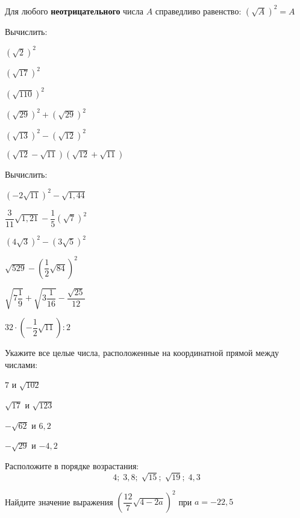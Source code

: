 \begin{class}[number=2]
\begin{definit}
		Для любого \textbf{неотрицательного} числа \( A \) справедливо равенство: \( \left( \sqrt{A} \right)^2=A \)
	\end{definit}
	\begin{listofex}[resume]
		\item Вычислить:
		\begin{enumcols}[itemcolumns=3]
			\item \( (\sqrt{2})^2 \)
			\item \( (\sqrt{17})^2 \)
			\item \( (\sqrt{110})^2 \)
			\item \( (\sqrt{29})^2+(\sqrt{29})^2 \)
			\item \( (\sqrt{13})^2-(\sqrt{12})^2 \)
			\item \( (\sqrt{12}-\sqrt{11})(\sqrt{12}+\sqrt{11}) \)

		\end{enumcols}
		\item Вычислить:
		\begin{enumcols}[itemcolumns=3]
			\item \( (-2\sqrt{11})^2-\sqrt{1,44} \)
			\item \( \dfrac{3}{11}\sqrt{1,21}-\dfrac{1}{5}(\sqrt{7})^2 \)
			\item \( (4\sqrt{3})^2-(3\sqrt{5})^2 \)
			\item \( \sqrt{529}-\left( \dfrac{1}{2}\sqrt{84} \right)^2 \)
			\item \( \sqrt{7\dfrac{1}{9}}+\sqrt{3\dfrac{1}{16}}-\dfrac{\sqrt{25}}{12} \)
			\item \( 32\cdot\left( -\dfrac{1}{2}\sqrt{11} \right):2 \)
		\end{enumcols}
		\item Укажите все целые числа, расположенные на координатной прямой между числами:
		\begin{enumcols}[itemcolumns=4]
			\item \( 7 \) и \( \sqrt{102} \)
			\item \( \sqrt{17} \) и \( \sqrt{123} \)
			\item \( -\sqrt{62} \) и \( 6,2 \)
			\item \( -\sqrt{29} \) и \( -4,2 \)
		\end{enumcols}
		\item Расположите в порядке возрастания: \[ 4;\;3,8;\;\sqrt{15};\;\sqrt{19};\;4,3 \]
		\item Найдите значение выражения \( \left( \dfrac{12}{7}\sqrt{4-2a} \right)^2 \) при \( a=-22,5 \)
	\end{listofex}
\end{class}
